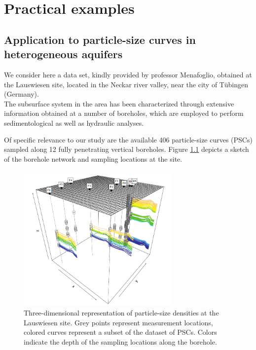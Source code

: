 \chapter{Practical examples}
\label{chapter3}

\noindent 

\section{Application to particle-size curves in heterogeneous aquifers}
We consider here a data set, kindly provided by professor Menafoglio, obtained at the Lauswiesen site, located in the Neckar river valley, near the city of T\"{u}bingen (Germany). \\ 
The subsurface system in the area has been characterized through extensive information obtained at a number of boreholes, which are employed to perform sedimentological as well as hydraulic analyses.

Of specific relevance to our study are the available 406 particle-size curves (PSCs) sampled along 12 fully penetrating vertical boreholes.
Figure \ref{fig:boreholes} depicts a sketch of the borehole network and sampling locations at the site. 

\begin{figure}
	\includegraphics[width=8cm]{./pictures/psc/particle_size_densities.png}
	\centering
	\caption{Three-dimensional representation of particle-size densities at the Lauswiesen site. Grey points represent measurement locations, colored curves represent a subset of the dataset of PSCs. Colors indicate the depth of the sampling locations along the borehole.}
	\label{fig:boreholes}	
\end{figure}

